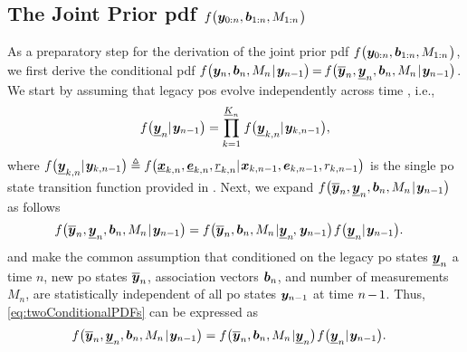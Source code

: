 \documentclass[11pt,a4paper]{article}
\newcommand{\ist}{\hspace*{.3mm}}
\newcommand{\rmv}{\hspace*{-.3mm}}
\begin{document}
\subsection{The Joint Prior \ac{pdf} $f \big (\V{y}_{0:n}, \V{b}_{1:n}, M_{1:n} \ist \big)$}
\label{sec:jointPrior}

As a preparatory step for the derivation of the joint prior \ac{pdf} $f \big (\V{y}_{0:n}, \V{b}_{1:n},  M_{1:n} \ist \big)$, we first derive the conditional \ac{pdf} $f\big(\V{y}_n, \V{b}_n,  M_n \ist | \ist \V{y}_{n-1}\big) \rmv=\rmv f\big(\overline{\V{y}}_n, \underline{\V{y}}_n, \V{b}_n, M_n \ist | \ist \V{y}_{n-1}\big) $. We start by assuming that legacy \acp{po} evolve independently across time \cite{MeyKroWilLauHlaBraWin:J18,GraFatSve:J19}, i.e.,
\begin{equation}
f\big(\underline{\V{y}}_n | \ist\V{y}_{n-1} \big) = 
    \prod^{\underline{K}_n}_{k=1} \ist f\big(\underline{\V{y}}_{k,n} | \ist\V{y}_{k,n-1} \big), \label{eq:stateTransitionAll}
\end{equation}
where $f\big(\underline{\V{y}}_{k,n} | \ist\V{y}_{k,n-1} \big) \triangleq f\big(\underline{\V{x}}_{k,n}, \underline{\V{e}}_{k,n}, \underline{r}_{k,n} | \ist \V{x}_{k,n-1}, \V{e}_{k,n-1}, r_{k,n-1}  \big)$ is the single \ac{po} state transition function provided in \cite[Eq.~(2) and (3)]{MeyWil:J21}. Next, we expand $f\big(\overline{\V{y}}_n, \underline{\V{y}}_n, \V{b}_n, M_n \ist | \ist \V{y}_{n-1}\big) $ as follows
\begin{align}
f\big(\overline{\V{y}}_n, \underline{\V{y}}_n, \V{b}_n, M_n \ist | \ist \V{y}_{n-1}\big) &= f\big(\overline{\V{y}}_n, \V{b}_n, M_n \ist | \underline{\V{y}}_n\rmv, \ist \V{y}_{n-1}\big) \ist f\big(\underline{\V{y}}_n | \ist\V{y}_{n-1} \big).
\label{eq:twoConditionalPDFs}
\end{align}
and make the common assumption \cite{MeyKroWilLauHlaBraWin:J18,GraFatSve:J19} that conditioned on the legacy \ac{po} states $\underline{\bm{y}}_n$ a time $n$, new \ac{po} states $\overline{\bm{y}}_n$, association vectors $\bm{b}_n$, and number of measurements $M_n$, are statistically independent of all \ac{po} states $\bm{y}_{n-1}$ at time $n \rmv-\rmv1$. Thus, \eqref{eq:twoConditionalPDFs} can be expressed as
\begin{align}
f\big(\overline{\V{y}}_n, \underline{\V{y}}_n, \V{b}_n, M_n \ist | \ist \V{y}_{n-1}\big) &= f\big(\overline{\V{y}}_n, \V{b}_n, M_n \ist | \underline{\V{y}}_n \big) \ist f\big(\underline{\V{y}}_n | \ist\V{y}_{n-1} \big).
\label{eq:otherTwoConditionalPDFs}
\end{align}
\end{document}
